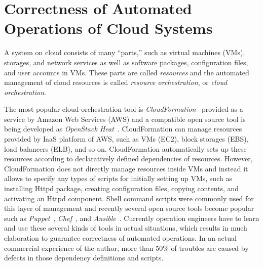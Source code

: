 \documentclass[12pt]{report}
\begin{document}
\section{Correctness of Automated Operations of Cloud Systems}
A system on cloud consists of many ``parts,'' such as virtual machines
(VMs), storages, and network services as well as software packages,
configuration files, and user accounts in VMs. These parts are called
{\it resources} and the automated management of cloud resources is
called {\it resource orchestration}, or {\it cloud orchestration}.

The most popular cloud orchestration tool is {\it
  CloudFormation}~\cite{CloudFormation} provided as a service by
Amazon Web Services (AWS) and a compatible open source tool is being
developed as {\it OpenStack Heat}~\cite{Heat}. CloudFormation can
manage resources provided by IaaS platform of AWS, such as VMs (EC2),
block storages (EBS), load balancers (ELB), and so on. CloudFormation
automatically sets up these resources according to declaratively
defined dependencies of resources. However, CloudFormation does not
directly manage resources inside VMs and instead it allows to specify
any types of scripts for initially setting up VMs, such as installing
Httpd package, creating configuration files, copying contents, and
activating an Httpd component. Shell command scripts were commonly
used for this layer of management and recently several open source
tools become popular such as {\it Puppet}~\cite{Puppet}, {\it
  Chef}~\cite{Chef}, and {\it Ansible}~\cite{Ansible}. Currently
operation engineers have to learn and use these several kinds of tools
in actual situations, which results in much elaboration to guarantee
correctness of automated operations. In an actual commercial
experience of the author, more than 50\% of troubles are caused by
defects in those dependency definitions and scripts.
\end{document}
